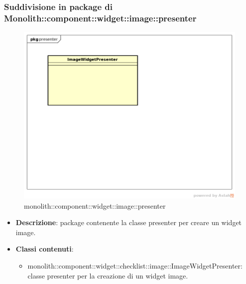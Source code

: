 \subsubsection{Suddivisione in package  di Monolith::component::widget::image::presenter}
\label{monolith::component::widget::image::presenter}
\begin{figure}[H]
	\centering
	\includegraphics[scale=0.5]{Sezioni/imgPackage/component_widget_image_presenter.png}
	\caption{monolith::component::widget::image::presenter}
\end{figure}
\begin{itemize}
	\item{\textbf{Descrizione}}: package contenente la classe presenter per creare un widget image.
	\item{\textbf{Classi contenuti}}:
	\begin{itemize}
	\item{monolith::component::widget::checklist::image::ImageWidgetPresenter}: classe presenter per la creazione di un widget image.
	\end{itemize}
\end{itemize}



